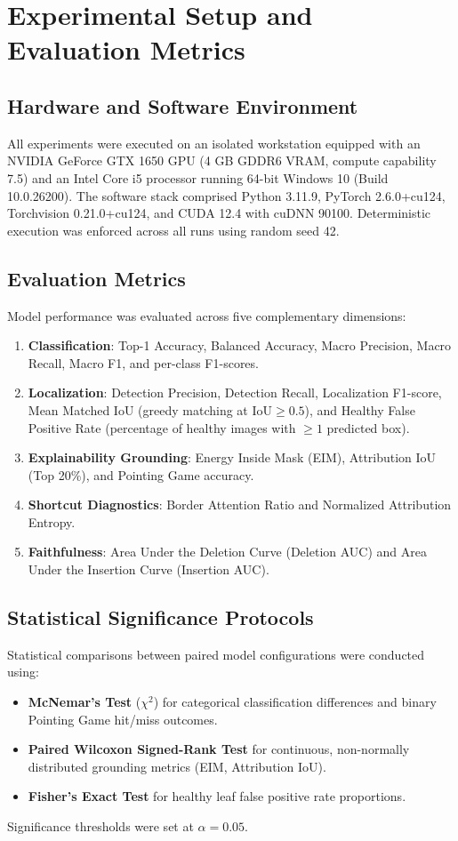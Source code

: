 \section{Experimental Setup and Evaluation Metrics}
\label{sec:setup_metrics}

\subsection{Hardware and Software Environment}
All experiments were executed on an isolated workstation equipped with an NVIDIA GeForce GTX 1650 GPU (4 GB GDDR6 VRAM, compute capability 7.5) and an Intel Core i5 processor running 64-bit Windows 10 (Build 10.0.26200). The software stack comprised Python 3.11.9, PyTorch 2.6.0+cu124, Torchvision 0.21.0+cu124, and CUDA 12.4 with cuDNN 90100. Deterministic execution was enforced across all runs using random seed 42.

\subsection{Evaluation Metrics}
Model performance was evaluated across five complementary dimensions:
\begin{enumerate}
    \item \textbf{Classification}: Top-1 Accuracy, Balanced Accuracy, Macro Precision, Macro Recall, Macro F1, and per-class F1-scores.
    \item \textbf{Localization}: Detection Precision, Detection Recall, Localization F1-score, Mean Matched IoU (greedy matching at $\text{IoU} \ge 0.5$), and Healthy False Positive Rate (percentage of healthy images with $\ge 1$ predicted box).
    \item \textbf{Explainability Grounding}: Energy Inside Mask (EIM), Attribution IoU (Top 20\%), and Pointing Game accuracy.
    \item \textbf{Shortcut Diagnostics}: Border Attention Ratio and Normalized Attribution Entropy.
    \item \textbf{Faithfulness}: Area Under the Deletion Curve (Deletion AUC) and Area Under the Insertion Curve (Insertion AUC).
\end{enumerate}

\subsection{Statistical Significance Protocols}
Statistical comparisons between paired model configurations were conducted using:
\begin{itemize}
    \item \textbf{McNemar's Test} ($\chi^2$) for categorical classification differences and binary Pointing Game hit/miss outcomes.
    \item \textbf{Paired Wilcoxon Signed-Rank Test} for continuous, non-normally distributed grounding metrics (EIM, Attribution IoU).
    \item \textbf{Fisher's Exact Test} for healthy leaf false positive rate proportions.
\end{itemize}
Significance thresholds were set at $\alpha = 0.05$.
